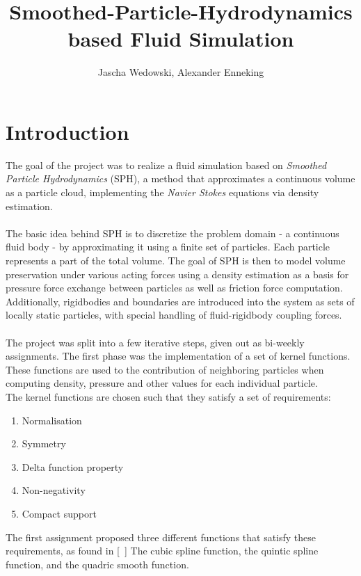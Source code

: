 \documentclass{ACGSeminar}
\begin{document}
\title{Smoothed-Particle-Hydrodynamics based Fluid Simulation}

\author{Jascha Wedowski, Alexander Enneking}

\maketitle
\tableofcontents



\newpage
\section{Introduction}
The goal of the project was to realize a fluid simulation based on \textit{Smoothed Particle Hydrodynamics} (SPH), a method that approximates a continuous volume as a particle cloud, implementing the \textit{Navier Stokes} equations via density estimation.\\
\\
The basic idea behind SPH is to discretize the problem domain - a continuous fluid body - by approximating it using a finite set of particles. Each particle represents a part of the total volume. The goal of SPH is then to model volume preservation under various acting forces using a density estimation as a basis for pressure force exchange between particles as well as friction force computation. Additionally, rigidbodies and boundaries are introduced into the system as sets of locally static particles, with special handling of fluid-rigidbody coupling forces. \\
\\
The project was split into a few iterative steps, given out as bi-weekly assignments.
The first phase was the implementation of a set of kernel functions. These functions are used to the contribution of neighboring particles when computing density, pressure and other values for each individual particle. \\
The kernel functions are chosen such that they satisfy a set of requirements:\\
\begin{enumerate}
\item Normalisation 
\item Symmetry 
\item Delta function property 
\item Non-negativity 
\item Compact support
\end{enumerate}
The first assignment proposed three different functions that satisfy these requirements, as found in [~\cite{Liu}] The cubic spline function, the quintic spline function, and the quadric smooth function.
\end{document}
